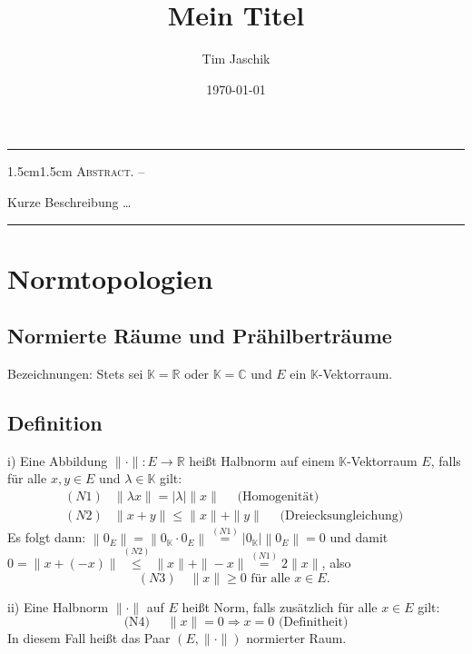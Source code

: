\documentclass[10pt, letterpaper]{article}
\title{Mein Titel}
\author{Tim Jaschik}
\date{\today}
\renewenvironment{abstract}
  {
    \begin{adjustwidth}{1.5cm}{1.5cm}
    \small
    \textsc{Abstract. –}%
  }
  {
    \end{adjustwidth}
  }
\begin{document}
\maketitle
\rule{\textwidth}{0.5pt}
\begin{abstract}
Kurze Beschreibung …
\end{abstract}
\rule{\textwidth}{0.5pt}
\vspace{0.5cm}

\tableofcontents

\pagebreak


\section*{Normtopologien}


\subsection*{Normierte Räume und Prähilberträume}



Bezeichnungen: Stets sei $\mathbb{K}=\mathbb{R}$ oder $\mathbb{K}=\mathbb{C}$ und $E$ ein $\mathbb{K}$-Vektorraum.


\subsection*{Definition}
i) Eine Abbildung $\|\cdot\|: E \rightarrow \mathbb{R}$ heißt Halbnorm auf einem $\mathbb{K}$-Vektorraum $E$, falls für alle $x, y \in E$ und $\lambda \in \mathbb{K}$ gilt:
$$
\begin{array}{ll}
(N 1) & \|\lambda x\|=|\lambda|\|x\| \quad \text { (Homogenität) } \\
(N 2) & \|x+y\| \leq\|x\|+\|y\| \quad \text { (Dreiecksungleichung) }
\end{array}
$$
Es folgt dann: $\left\|0_{E}\right\|=\left\|0_{\mathbb{K}} \cdot 0_{E}\right\| \stackrel{(N 1)}{=}\left|0_{\mathbb{K}}\right|\left\|0_{E}\right\|=0$ und damit $0=\|x+(-x)\| \stackrel{(N 2)}{\leq} \|x\|+\|-x\| \stackrel{(N 1)}{=} 2\|x\|$, also
$$
(N 3) \quad\|x\| \geq 0 \text { für alle } x \in E \text {. }
$$

ii) Eine Halbnorm $\|\cdot\|$ auf $E$ heißt Norm, falls zusätzlich für alle $x \in E$ gilt:
$$
\text { (N4) } \quad\|x\|=0 \Rightarrow x=0 \text { (Definitheit) }
$$
In diesem Fall heißt das Paar $(E,\|\cdot\|)$ normierter Raum.
\end{document}
